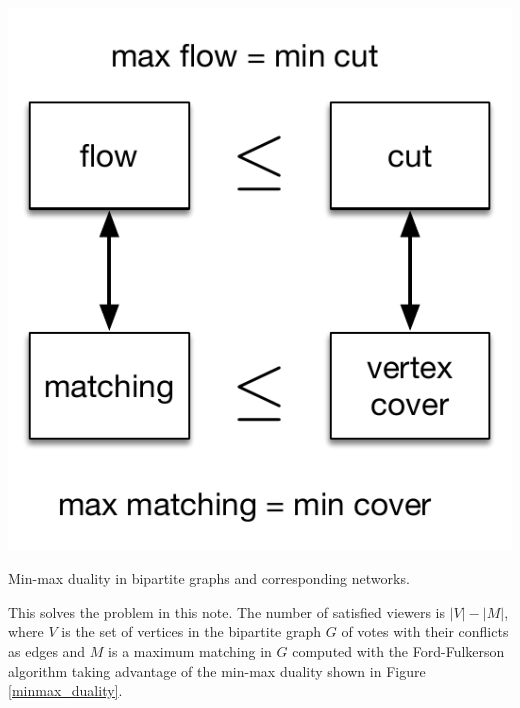 \begin{marginfigure}
    \includegraphics[scale=0.5]{flowcutminmax.pdf}
    \caption{Min-max duality in bipartite graphs and corresponding networks.}
	\label{minmax_duality}
\end{marginfigure}{}

This solves the problem in this note. The number of satisfied viewers is $|V| - |M|$, where $V$ is the set of vertices in the bipartite graph $G$ of votes with their conflicts as edges and $M$ is a maximum matching in $G$ computed with the Ford-Fulkerson algorithm taking advantage of the min-max duality shown in Figure \ref{minmax_duality}.







